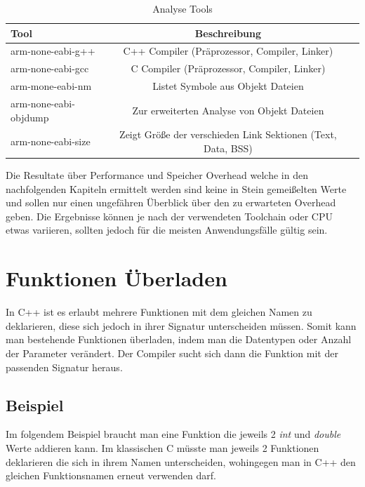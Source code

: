 \documentclass[MES,Master,ngerman]{twbook}%
\begin{document}
\begin{table}[!htb]
	\centering
	\begin{tabular}{| l | c | r |}
		\hline
		\textbf{Tool}  & \textbf{Beschreibung} \\ \hline
		arm-none-eabi-g++           & C++ Compiler (Präprozessor, Compiler, Linker) \\ \hline
		arm-none-eabi-gcc       	& C	  Compiler (Präprozessor, Compiler, Linker) \\ \hline
		arm-mone-eabi-nm        	& Listet Symbole aus Objekt Dateien \\ \hline
		arm-none-eabi-objdump		& Zur erweiterten Analyse von Objekt Dateien \\ \hline
		arm-none-eabi-size			& Zeigt Größe der verschieden Link Sektionen (Text, Data, BSS) \\ \hline
	\end{tabular}
	
	\caption{Analyse Tools}
	\label{tbl:analystools}
	
\end{table}

Die Resultate über Performance und Speicher Overhead welche in den nachfolgenden Kapiteln ermittelt werden sind keine in Stein gemeißelten Werte und sollen nur einen ungefähren Überblick über den zu erwarteten Overhead geben. Die Ergebnisse können je nach der verwendeten Toolchain oder CPU etwas variieren, sollten jedoch für die meisten Anwendungsfälle gültig sein.


\newpage
\section{Funktionen Überladen}
In C++ ist es erlaubt mehrere Funktionen mit dem gleichen Namen zu deklarieren, diese sich jedoch in ihrer Signatur unterscheiden müssen. Somit kann man bestehende Funktionen überladen, indem man die Datentypen oder Anzahl der Parameter verändert. Der Compiler sucht sich dann die Funktion mit der passenden Signatur heraus. 
\subsection{Beispiel} \label{beispiel:1}
Im folgendem Beispiel braucht man eine Funktion die jeweils 2 \textit{int} und \textit{double} Werte addieren kann. Im klassischen C müsste man jeweils 2 Funktionen deklarieren die sich in ihrem Namen unterscheiden, wohingegen man in C++ den gleichen Funktionsnamen erneut verwenden darf.
\begin{figure}[!htb]
	\begin{subfigure}[b]{0.5\textwidth}
		
		\label{fig:1}
	\end{subfigure}
	\begin{subfigure}[b]{0.5\textwidth}
		
		\label{fig:2}
	\end{subfigure}
\end{figure}
\end{document}
